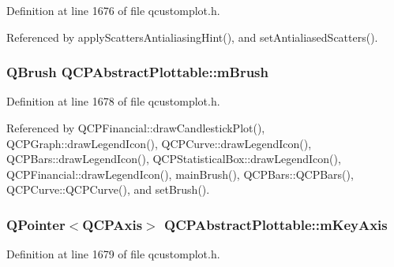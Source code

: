 Definition at line 1676 of file qcustomplot.\+h.



Referenced by apply\+Scatters\+Antialiasing\+Hint(), and set\+Antialiased\+Scatters().

\hypertarget{class_q_c_p_abstract_plottable_a33f00674c0161c13315ab9da0895418e}{}
\subsubsection[{m\+Brush}]{\setlength{\rightskip}{0pt plus 5cm}Q\+Brush Q\+C\+P\+Abstract\+Plottable\+::m\+Brush\hspace{0.3cm}{\ttfamily [protected]}}\label{class_q_c_p_abstract_plottable_a33f00674c0161c13315ab9da0895418e}


Definition at line 1678 of file qcustomplot.\+h.



Referenced by Q\+C\+P\+Financial\+::draw\+Candlestick\+Plot(), Q\+C\+P\+Graph\+::draw\+Legend\+Icon(), Q\+C\+P\+Curve\+::draw\+Legend\+Icon(), Q\+C\+P\+Bars\+::draw\+Legend\+Icon(), Q\+C\+P\+Statistical\+Box\+::draw\+Legend\+Icon(), Q\+C\+P\+Financial\+::draw\+Legend\+Icon(), main\+Brush(), Q\+C\+P\+Bars\+::\+Q\+C\+P\+Bars(), Q\+C\+P\+Curve\+::\+Q\+C\+P\+Curve(), and set\+Brush().

\hypertarget{class_q_c_p_abstract_plottable_a426f42e254d0f8ce5436a868c61a6827}{}
\subsubsection[{m\+Key\+Axis}]{\setlength{\rightskip}{0pt plus 5cm}Q\+Pointer$<${\bf Q\+C\+P\+Axis}$>$ Q\+C\+P\+Abstract\+Plottable\+::m\+Key\+Axis\hspace{0.3cm}{\ttfamily [protected]}}\label{class_q_c_p_abstract_plottable_a426f42e254d0f8ce5436a868c61a6827}


Definition at line 1679 of file qcustomplot.\+h.



